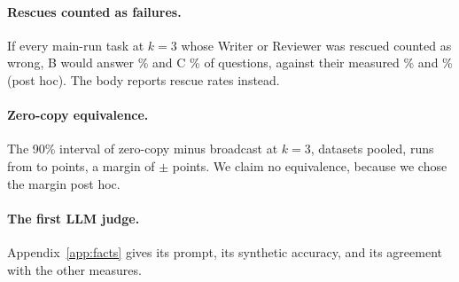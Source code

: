 \documentclass[sigplan,10pt,nonacm,review,anonymous]{acmart}
\begin{document}
\paragraph{Rescues counted as failures.} If every main-run task at $k=3$ whose Writer or Reviewer was rescued
counted as wrong, B would answer \nStrictB\% and C \nStrictC\% of questions, against their measured \nAccB\%
and \nAccC\% (post hoc). The body reports rescue rates instead.

\paragraph{Zero-copy equivalence.} The 90\% interval of zero-copy minus broadcast at $k=3$, datasets pooled, runs
from \nRTwelveZcNinetyLo to \nRTwelveZcNinetyHi points, \nRTwelveZcEquiv a margin of $\pm$\nRTwelveZcMargin
points. We claim no equivalence, because we chose the margin post hoc.

\paragraph{The first LLM judge.} Appendix~\ref{app:facts} gives its prompt, its synthetic accuracy, and its
agreement with the other measures.

\clearpage
\end{document}
